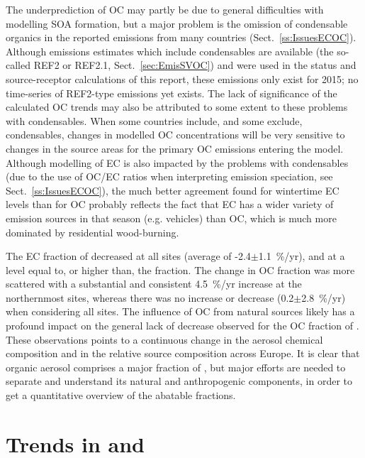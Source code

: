 The underprediction of OC may partly be due to general difficulties with modelling SOA formation, but a major problem is the omission of condensable organics in the reported \pmfine emissions from many countries (Sect.~\ref{ss:IssuesECOC}). Although emissions estimates which include condensables are available (the so-called REF2 or REF2.1, Sect.~\ref{sec:EmisSVOC})  and were used in the status and source-receptor calculations of this report, these emissions only exist for 2015; no time-series of REF2-type emissions yet exists. The lack of significance of the calculated OC trends may also be attributed to some extent to these problems with condensables. When some countries include, and some exclude, condensables, changes in modelled OC concentrations will be very sensitive to changes in the source areas for the primary OC emissions entering the model.
Although modelling of EC is also impacted by the problems with condensables (due to the use of OC/EC ratios when interpreting \pmfine emission speciation, see Sect.~\ref{ss:IssuesECOC}), the much better agreement found for wintertime EC levels than for OC probably reflects the fact that EC has a wider variety of emission sources in that season (e.g. vehicles) than OC, which is much more dominated by residential wood-burning.


The EC fraction of \pmfine  decreased at all
sites (average of -2.4$\pm$1.1~\%/yr), and at a level equal to, or higher than, the  fraction. The
change in OC fraction was more scattered with a substantial and
consistent 4.5~\%/yr increase at the northernmost sites, whereas
there was no increase or decrease (0.2$\pm$2.8~\%/yr) when considering
all sites. The influence of OC from natural sources likely has a profound
impact on the general lack of decrease observed for the OC fraction of
\pmfine. These observations points to a continuous change in the aerosol
chemical composition and in the relative source composition across
Europe. It is clear that organic aerosol comprises a major fraction of \pmfine, but major efforts are needed to separate and understand its natural and anthropogenic components, in order to get a quantitative overview of the abatable fractions.






\section{\label{sec:Trends_PM }Trends in \PM[10] and \PM[2.5] }

